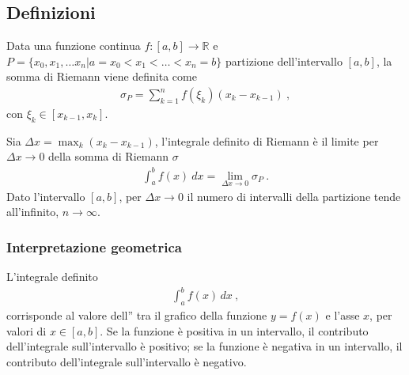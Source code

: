 \documentclass[letterpaper,10pt,italian]{jupyterBook}
\begin{document}
\subsection{Definizioni}
\label{\detokenize{ch/infinitesimal_calculus/integrals:definizioni}}\label{\detokenize{ch/infinitesimal_calculus/integrals:infinitesimal-calculus-integrals-def}}
\sphinxAtStartPar
{} Data una funzione continua \(f: [a,b] \rightarrow \mathbb{R}\) e \(P = \{ x_0, x_1, \dots x_n | a = x_0 < x_1 < \dots < x_n = b \}\) partizione dell’intervallo \([a,b]\), la somma di Riemann viene definita come
\begin{equation}\label{equation:ch/infinitesimal_calculus/integrals:infinitesimal-calculus:integrals:riemann:sum}
\begin{split}\sigma_P = \sum_{k=1}^{n} f(\xi_k) (x_{k} - x_{k-1}) \ ,\end{split}
\end{equation}
\sphinxAtStartPar
con \(\xi_k \in [x_{k-1}, x_k]\).

\sphinxAtStartPar
{} Sia \(\Delta x = \max_k (x_{k} - x_{k-1})\), l’integrale definito di Riemann è  il limite per \(\Delta x \rightarrow 0\) della somma di Riemann \(\sigma\)
\begin{equation}\label{equation:ch/infinitesimal_calculus/integrals:infinitesimal-calculus:integrals:riemann:def}
\begin{split}\int_a^b f(x) \ dx = \lim_{\Delta x \rightarrow 0} \sigma_P \ .\end{split}
\end{equation}
\sphinxAtStartPar
{} Dato l’intervallo \([a,b]\), per \(\Delta x \rightarrow 0\) il numero di intervalli della partizione tende all’infinito, \(n \rightarrow \infty\).


\subsubsection{Interpretazione geometrica}
\label{\detokenize{ch/infinitesimal_calculus/integrals:interpretazione-geometrica}}
\sphinxAtStartPar
L’integrale definito
\begin{equation*}
\begin{split}\int_{a}^{b} f(x) \, dx \ ,\end{split}
\end{equation*}
\sphinxAtStartPar
corrisponde al valore dell” tra il grafico della funzione \(y=f(x)\) e l’asse \(x\), per valori di \(x \in [a,b]\). Se la funzione è positiva in un intervallo, il contributo dell’integrale sull’intervallo è positivo; se la funzione è negativa in un intervallo, il contributo dell’integrale sull’intervallo è negativo.
\end{document}

